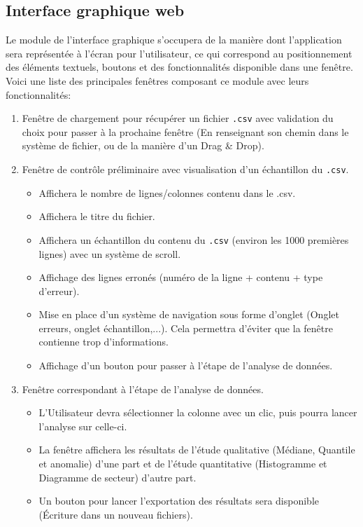 		\subsection{Interface graphique web}
			Le module de l'interface graphique s'occupera de la manière dont l'application sera représentée à l'écran pour l'utilisateur, ce qui correspond au positionnement des éléments textuels, boutons et des fonctionnalités disponible dans une fenêtre. Voici une liste des principales fenêtres composant ce module avec leurs fonctionnalités:
			\begin{enumerate}
			\item Fenêtre de chargement pour récupérer un fichier \lstinline!.csv! avec validation du choix pour passer à la prochaine fenêtre (En renseignant son chemin dans le système de fichier, ou de la manière d'un Drag \& Drop).
			\item Fenêtre de contrôle préliminaire avec visualisation d'un échantillon du \lstinline!.csv!.		
				\begin{itemize}
				\item Affichera le nombre de lignes/colonnes contenu dans le .csv.
				\item Affichera le titre du fichier.
				\item Affichera un échantillon du contenu du \lstinline!.csv! (environ les 1000 premières lignes) avec un système de scroll.
				\item Affichage des lignes erronés (numéro de la ligne + contenu + type d'erreur).
				\item Mise en place d'un système de navigation sous forme d'onglet (Onglet erreurs, onglet échantillon,...). Cela permettra d'éviter que la fenêtre contienne trop d'informations.
				\item Affichage d'un bouton pour passer à l'étape de l'analyse de données.
				\end{itemize}
			\item Fenêtre correspondant à l'étape de l'analyse de données.
				\begin{itemize}
				\item L'Utilisateur devra sélectionner la colonne avec un clic, puis pourra lancer l'analyse sur celle-ci.
				\item La fenêtre affichera les résultats de l'étude qualitative (Médiane, Quantile et anomalie) d'une part et de l'étude quantitative (Histogramme et Diagramme de secteur) d'autre part.
				\item Un bouton pour lancer l'exportation des résultats sera disponible (Écriture dans un nouveau fichiers).
				\end{itemize}
			\end{enumerate}
		

